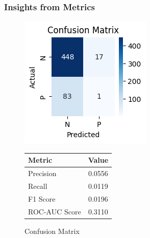 \documentclass{article}
\begin{document}
\subsubsection*{Insights from Metrics}
\begin{figure}[h]
    \centering
    \begin{minipage}[c]{0.45\linewidth}
        \includegraphics[width=\linewidth]{assets/c.png}
        \caption{Confusion Matrix}
        \label{fig:a}
    \end{minipage}
    \begin{minipage}[c]{0.45\linewidth}
        \centering
        \vspace{0.5cm}
        \begin{tabular}{|l|c|}
            \hline
            Metric & Value \\ \hline
            Precision & 0.0556 \\ \hline
            Recall & 0.0119 \\ \hline
            F1 Score & 0.0196 \\ \hline
            ROC-AUC Score & 0.3110 \\ \hline
        \end{tabular}
    \end{minipage}
\end{figure}
\end{document}
